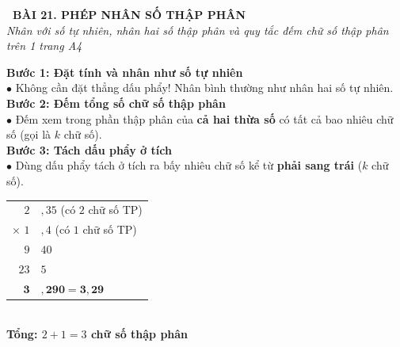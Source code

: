 \documentclass[14pt,a4paper,oneside]{extbook}
\begin{document}
\noindent
\begin{tcolorbox}[
  enhanced,
  colback=teal!8!white,
  colframe=teal!80!black,
  arc=3mm,
  boxrule=1.1pt,
  width=\linewidth,
  halign=center,
  top=2.2mm, bottom=2.2mm,
  left=3mm, right=3mm,
  drop fuzzy shadow
]
  {\large\bfseries\color{teal!95!black}\faBookmark\ BÀI 21. PHÉP NHÂN SỐ THẬP PHÂN}\\[2pt]
  {\scriptsize\color{black!75}\itshape Nhân với số tự nhiên, nhân hai số thập phân và quy tắc đếm chữ số thập phân trên 1 trang A4}
\end{tcolorbox}

\vspace{3.2mm}
\noindent
\begin{minipage}[t]{0.58\textwidth}
  \begin{tcolorbox}[
    enhanced,
    title={\footnotesize\bfseries\color{white}\faKey\ 1. Quy tắc nhân hai số thập phân},
    colback=blue!2!white,
    colframe=blue!75!black,
    arc=2.5mm, boxrule=0.8pt, top=1.8mm, bottom=1.8mm, left=2.2mm, right=2.2mm
  ]
    \footnotesize
    \textbf{Bước 1: Đặt tính và nhân như số tự nhiên}\\
    $\bullet$ Không cần đặt thẳng dấu phẩy! Nhân bình thường như nhân hai số tự nhiên.\\[2pt]
    \textbf{Bước 2: Đếm tổng số chữ số thập phân}\\
    $\bullet$ Đếm xem trong phần thập phân của \textbf{cả hai thừa số} có tất cả bao nhiêu chữ số (gọi là $k$ chữ số).\\[2pt]
    \textbf{Bước 3: Tách dấu phẩy ở tích}\\
    $\bullet$ Dùng dấu phẩy tách ở tích ra bấy nhiêu chữ số kể từ \textbf{phải sang trái} ($k$ chữ số).
  \end{tcolorbox}
\end{minipage}%
\hfill
\begin{minipage}[t]{0.40\textwidth}
  \begin{tcolorbox}[
    enhanced,
    title={\footnotesize\bfseries\color{white}\faPencil\ Ví dụ $2,35 \times 1,4$},
    colback=teal!2!white,
    colframe=teal!75!black,
    arc=2.5mm, boxrule=0.8pt, top=1.8mm, bottom=1.8mm, left=1.5mm, right=1.5mm,
    halign=center
  ]
    \small
    \begin{tabular}{r@{\,}l}
      $2$&${,}35$ \quad (có $2$ chữ số TP) \\
      $\times$ \quad $1$&${,}4$ \quad (có $1$ chữ số TP) \\ \hline
      $9$&$40$ \\
      $23$&$5$ \\ \hline
      $\mathbf{3}$&${\mathbf{,}}\mathbf{290} = \mathbf{3,29}$
    \end{tabular}\\[3pt]
    {\tiny\color{teal!95!black}\bfseries Tổng: $2 + 1 = 3$ chữ số thập phân}
  \end{tcolorbox}
\end{minipage}
\end{document}
